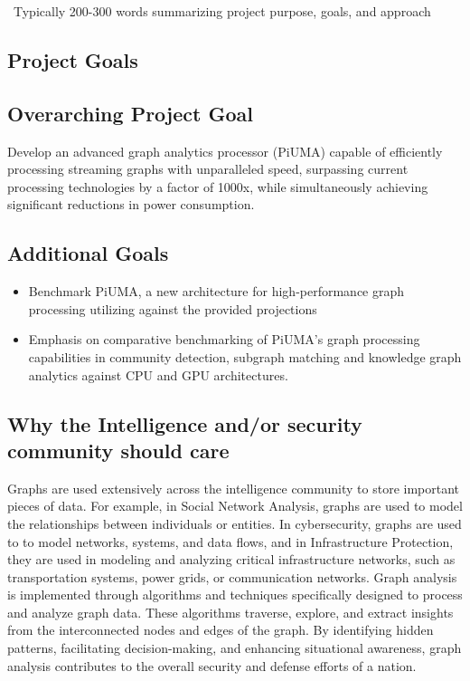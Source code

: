 \documentclass[letterpaper, 10pt]{article}
\begin{document}
\abstractname{~Typically 200-300 words summarizing project purpose, goals, and approach~}
\begin{multicols}{2}    
    \section{Project Goals}
        \subsection{Overarching Project Goal}
        Develop an advanced graph analytics processor (PiUMA) capable of efficiently processing streaming graphs with unparalleled speed, surpassing current processing technologies by a factor of 1000x, while simultaneously achieving significant reductions in power consumption.  \cite{Joshi2022}
        \subsection{Additional Goals}
        \begin{itemize}
        \item Benchmark PiUMA, a new architecture for high-performance graph processing utilizing against the provided projections 
        \item Emphasis on comparative benchmarking of PiUMA’s graph processing capabilities in community detection, subgraph matching and knowledge graph analytics against CPU and GPU architectures.
        \end{itemize}

        \subsection{Why the Intelligence and/or security community should care}
        Graphs are used extensively across the intelligence community to store important pieces of data. For example, in Social Network Analysis, graphs are used to model the relationships between individuals or entities. In cybersecurity, graphs are used to to model networks, systems, and data flows, and in Infrastructure Protection, they are used in modeling and analyzing critical infrastructure networks, such as transportation systems, power grids, or communication networks. 
        Graph analysis is implemented through algorithms and techniques specifically designed to process and analyze graph data. These algorithms traverse, explore, and extract insights from the interconnected nodes and edges of the graph. By identifying hidden patterns, facilitating decision-making, and enhancing situational awareness, graph analysis contributes to the overall security and defense efforts of a nation. 
        

\end{multicols}
\end{document}

